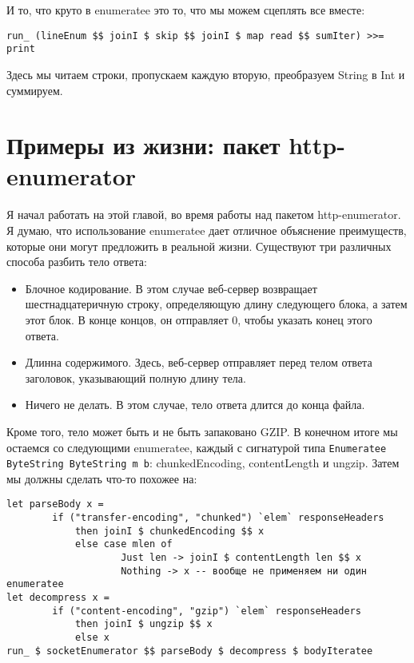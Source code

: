 И то, что круто в enumeratee это то, что мы можем сцеплять все вместе:

\begin{lstlisting}
run_ (lineEnum $$ joinI $ skip $$ joinI $ map read $$ sumIter) >>= print
\end{lstlisting}%

Здесь мы читаем строки, пропускаем каждую вторую, преобразуем String в Int и суммируем.

\section{Примеры из жизни: пакет http-enumerator}

Я начал работать на этой главой, во время работы над пакетом http-enumerator. Я думаю, что использование enumeratee дает отличное объяснение преимуществ, которые они могут предложить в реальной жизни. Существуют три различных способа разбить тело ответа:

\begin{itemize}
\item Блочное кодирование. В этом случае веб-сервер возвращает шестнадцатеричную строку, определяющую длину следующего блока, а затем этот блок. В конце концов, он отправляет 0, чтобы указать конец этого ответа.
\item Длинна содержимого. Здесь, веб-сервер отправляет перед телом ответа заголовок, указывающий полную длину тела.
\item Ничего не делать. В этом случае, тело ответа длится до конца файла.
\end{itemize}

Кроме того, тело может быть и не быть запаковано GZIP. В конечном итоге мы остаемся со следующими enumeratee, каждый с сигнатурой типа \lstinline'Enumeratee ByteString ByteString m b': chunkedEncoding, contentLength и ungzip. Затем мы должны сделать что-то похожее на:

\begin{lstlisting}
let parseBody x =
        if ("transfer-encoding", "chunked") `elem` responseHeaders
            then joinI $ chunkedEncoding $$ x
            else case mlen of
                    Just len -> joinI $ contentLength len $$ x
                    Nothing -> x -- вообще не применяем ни один enumeratee
let decompress x =
        if ("content-encoding", "gzip") `elem` responseHeaders
            then joinI $ ungzip $$ x
            else x
run_ $ socketEnumerator $$ parseBody $ decompress $ bodyIteratee
\end{lstlisting}%

